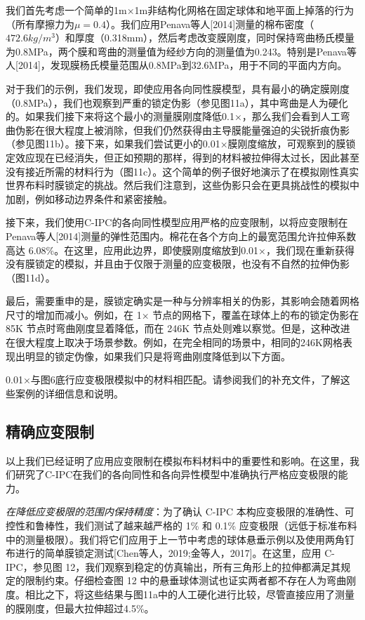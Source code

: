 我们首先考虑一个简单的1m×1m非结构化网格在固定球体和地平面上掉落的行为（所有摩擦力为$\mu = 0.4$）。我们应用Penava等人[2014]测量的棉布密度（$472.6kg/m^3$）和厚度（0.318mm），然后考虑改变膜刚度，同时保持弯曲杨氏模量为0.8MPa，两个膜和弯曲的测量值为经纱方向的测量值为0.243。特别是Penava等人[2014]，发现膜杨氏模量范围从0.8MPa到32.6MPa，用于不同的平面内方向。

对于我们的示例，我们发现，即使应用各向同性膜模型，具有最小的确定膜刚度（0.8MPa），我们也观察到严重的锁定伪影（参见图11a），其中弯曲是人为硬化的。如果我们接下来将这个最小的测量膜刚度降低0.1×，那么我们会看到人工弯曲伪影在很大程度上被消除，但我们仍然获得由主导膜能量强迫的尖锐折痕伪影（参见图11b）。接下来，如果我们尝试更小的0.01×膜刚度缩放，可观察到的膜锁定效应现在已经消失，但正如预期的那样，得到的材料被拉伸得太过长，因此甚至没有接近所需的材料行为（图11c）。这个简单的例子很好地演示了在模拟刚性真实世界布料时膜锁定的挑战。然后我们注意到，这些伪影只会在更具挑战性的模拟中加剧，例如移动边界条件和紧密接触。

接下来，我们使用C-IPC的各向同性模型应用严格的应变限制，以将应变限制在Penava等人[2014]测量的弹性范围内。棉花在各个方向上的最宽范围允许拉伸系数高达 6.08\%。在这里，应用此边界，即使膜刚度缩放到0.01×，我们现在重新获得没有膜锁定的模拟，并且由于仅限于测量的应变极限，也没有不自然的拉伸伪影（图11d）。

最后，需要重申的是，膜锁定确实是一种与分辨率相关的伪影，其影响会随着网格尺寸的增加而减小。例如，在 1× 节点的网格下，覆盖在球体上的布的锁定伪影在 85K 节点时弯曲刚度显着降低，而在 246K 节点处则难以察觉。但是，这种改进在很大程度上取决于场景参数。例如，在完全相同的场景中，相同的246K网格表现出明显的锁定伪像，如果我们只是将弯曲刚度降低到以下方面。

0.01×与图6底行应变极限模拟中的材料相匹配。请参阅我们的补充文件，了解这些案例的详细信息和说明。

\subsection{精确应变限制}

以上我们已经证明了应用应变限制在模拟布料材料中的重要性和影响。在这里，我们研究了C-IPC在我们的各向同性和各向异性模型中准确执行严格应变极限的能力。

\textit{在降低应变极限的范围内保持精度}：为了确认 C-IPC 本构应变极限的准确性、可控性和鲁棒性，我们测试了越来越严格的 1\% 和 0.1\% 应变极限（远低于标准布料中的测量极限）。我们将它们应用于上一节中考虑的球体悬垂示例以及使用两角钉布进行的简单膜锁定测试[Chen等人，2019;金等人，2017]。在这里，应用 C-IPC，参见图 12，我们观察到稳定的仿真输出，所有三角形上的拉伸都满足其规定的限制约束。仔细检查图 12 中的悬垂球体测试也证实两者都不存在人为弯曲刚度。相比之下，将这些结果与图11a中的人工硬化进行比较，尽管直接应用了测量的膜刚度，但最大拉伸超过4.5\%。

